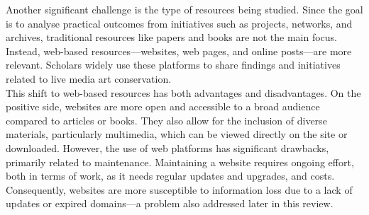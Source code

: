 Another significant challenge is the type of resources being studied. Since the goal is to analyse practical outcomes from initiatives such as projects, networks, and archives, traditional resources like papers and books are not the main focus. Instead, web-based resources—websites, web pages, and online posts—are more relevant. Scholars widely use these platforms to share findings and initiatives related to live media art conservation.\\
This shift to web-based resources has both advantages and disadvantages. On the positive side, websites are more open and accessible to a broad audience compared to articles or books. They also allow for the inclusion of diverse materials, particularly multimedia, which can be viewed directly on the site or downloaded. However, the use of web platforms has significant drawbacks, primarily related to maintenance. Maintaining a website requires ongoing effort, both in terms of work, as it needs regular updates and upgrades, and costs. Consequently, websites are more susceptible to information loss due to a lack of updates or expired domains—a problem also addressed later in this review.

